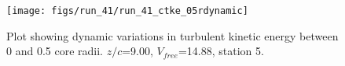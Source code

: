 \begin{figure}[H]
\centering
\texttt{[image: figs/run\_41/run\_41\_ctke\_05rdynamic]}
\caption{Plot showing dynamic variations in turbulent kinetic energy between 0 and 0.5 core radii. $z/c$=9.00, $V_{free}$=14.88, station 5.}
\label{fig:run_41_ctke_05rdynamic}
\end{figure}


